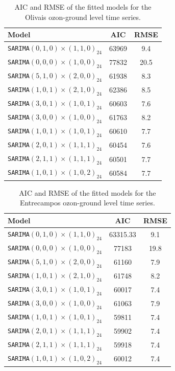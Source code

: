 \documentclass{article}
\begin{document}
\begin{table}[ht!]
    \centering
    \begin{tabular}{|l|c|c|} \hline
    \toprule
    \textbf{Model} & \textbf{AIC} & \textbf{RMSE} \\ \hline
    \verb|SARIMA|$(0,1,0) \times (1,1,0)_{24}$ & 63969 & 9.4 \\ \hline
    \verb|SARIMA|$(0,0,0) \times (1,0,0)_{24}$ & 77832 & 20.5 \\ \hline
    \verb|SARIMA|$(5,1,0) \times (2,0,0)_{24}$ &  61938 & 8.3 \\ \hline
    \verb|SARIMA|$(1,0,1) \times (2,1,0)_{24}$ & 62386 & 8.5  \\ \hline
    \verb|SARIMA|$(3,0,1) \times (1,0,1)_{24}$ & 60603 & 7.6 \\ \hline
    \verb|SARIMA|$(3,0,0) \times (1,0,0)_{24}$ & 61763 & 8.2  \\ \hline
    \verb|SARIMA|$(1,0,1) \times (1,0,1)_{24}$ & 60610 & 7.7 \\ \hline
    \verb|SARIMA|$(2,0,1) \times (1,1,1)_{24}$ & 60454 & 7.6 \\ \hline
    \verb|SARIMA|$(2,1,1) \times (1,1,1)_{24}$ & 60501 & 7.7 \\ \hline
    \verb|SARIMA|$(1,0,1) \times (1,0,2)_{24}$ &  60584 & 7.7 \\ \hline
    \end{tabular}
    \caption{AIC and RMSE of the fitted models for the Olivais ozon-ground level time series.}
    \label{tab:Olivais}
\end{table}

\begin{table}[ht!]
    \centering
    \begin{tabular}{|l|c|c|} \hline
    \textbf{Model} & \textbf{AIC} & \textbf{RMSE} \\ \hline
    \verb|SARIMA|$(0,1,0) \times (1,1,0)_{24}$ & 63315.33 & 9.1  \\ \hline
    \verb|SARIMA|$(0,0,0) \times (1,0,0)_{24}$ & 77183 & 19.8   \\ \hline
    \verb|SARIMA|$(5,1,0) \times (2,0,0)_{24}$ & 61160 & 7.9  \\ \hline
    \verb|SARIMA|$(1,0,1) \times (2,1,0)_{24}$ & 61748 & 8.2   \\ \hline
    \verb|SARIMA|$(3,0,1) \times (1,0,1)_{24}$ & 60017 & 7.4  \\ \hline
    \verb|SARIMA|$(3,0,0) \times (1,0,0)_{24}$ & 61063 & 7.9   \\ \hline
    \verb|SARIMA|$(1,0,1) \times (1,0,1)_{24}$ & 59811 & 7.4  \\ \hline
    \verb|SARIMA|$(2,0,1) \times (1,1,1)_{24}$ & 59902 & 7.4  \\ \hline
    \verb|SARIMA|$(2,1,1) \times (1,1,1)_{24}$ & 59918 & 7.4  \\ \hline
    \verb|SARIMA|$(1,0,1) \times (1,0,2)_{24}$ & 60012 & 7.4  \\ \hline
    \end{tabular}
    \caption{AIC and RMSE of the fitted models for the Entrecampos ozon-ground level time series.}
    \label{tab:Entrecampos}
\end{table}
\end{document}
